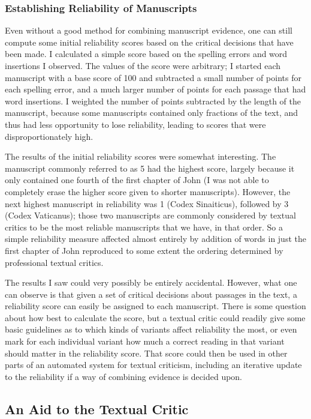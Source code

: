 \documentclass[onecolumn, 12pt]{article}
\begin{document}
\subsubsection{Establishing Reliability of Manuscripts}

Even without a good method for combining manuscript evidence, one can still
compute some initial reliability scores based on the critical decisions that
have been made.  I calculated a simple score based on the spelling errors and
word insertions I observed.  The values of the score were arbitrary; I started
each manuscript with a base score of 100 and subtracted a small number of
points for each spelling error, and a much larger number of points for each
passage that had word insertions.  I weighted the number of points subtracted
by the length of the manuscript, because some manuscripts contained only
fractions of the text, and thus had less opportunity to lose reliability,
leading to scores that were disproportionately high.

The results of the initial reliability scores were somewhat interesting.  The
manuscript commonly referred to as 5 had the highest score, largely because it
only contained one fourth of the first chapter of John (I was not able to
completely erase the higher score given to shorter manuscripts).  However, the
next highest manuscript in reliability was 1 (Codex Sinaiticus), followed by 3
(Codex Vaticanus); those two manuscripts are commonly considered by textual
critics to be the most reliable manuscripts that we have, in that order.  So a
simple reliability measure affected almost entirely by addition of words in
just the first chapter of John reproduced to some extent the ordering
determined by professional textual critics.

The results I saw could very possibly be entirely accidental.  However, what
one can observe is that given a set of critical decisions about passages in the
text, a reliability score can easily be assigned to each manuscript.  There is
some question about how best to calculate the score, but a textual critic could
readily give some basic guidelines as to which kinds of variants affect
reliability the most, or even mark for each individual variant how much a
correct reading in that variant should matter in the reliability score.  That
score could then be used in other parts of an automated system for textual
criticism, including an iterative update to the reliability if a way of
combining evidence is decided upon.

\subsection{An Aid to the Textual Critic}
\label{sec:aid-to-critic}
\end{document}
